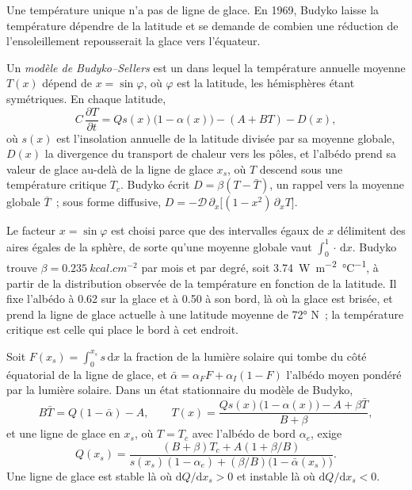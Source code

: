 Une température unique n'a pas de ligne de glace. En 1969, Budyko laisse la température
dépendre de la latitude et se demande de combien une réduction de l'ensoleillement
repousserait la glace vers l'équateur.

\begin{definition}\label{def:b3:climate-models:budyko-sellers}
Un \emph{modèle de Budyko--Sellers} est un
 dans lequel la température annuelle moyenne $T(x)$ dépend de
$x = \sin\varphi$, où $\varphi$ est la latitude, les hémisphères étant symétriques.
En chaque latitude,
\[
C\,\frac{\partial T}{\partial t} = Qs(x)\big(1 - \alpha(x)\big) - (A + BT) - D(x) ,
\]
où $s(x)$ est l'insolation annuelle de la latitude divisée par sa moyenne
globale, $D(x)$ la divergence du transport de chaleur vers les pôles, et l'albédo
prend sa valeur de glace au-delà de la ligne de glace $x_s$, où $T$ descend sous une
température critique $T_c$. Budyko écrit $D = \beta(T - \bar T)$, un
rappel vers la moyenne globale $\bar T$~; sous forme diffusive, $D =
-\mathcal D\,\partial_x\big[(1 - x^2)\,\partial_xT\big]$.
\end{definition}

Le facteur $x = \sin\varphi$ est choisi parce que des intervalles égaux de $x$
délimitent des aires égales de la sphère, de sorte qu'une moyenne globale vaut $\int_0^1\cdot\,\mathrm
dx$. Budyko trouve $\beta = \qty{0.235}{kcal.cm^{-2}}$ par mois et par
degré, soit \qty{3.74}{W.m^{-2}.\celsius^{-1}}, à partir de la distribution observée
de la température en fonction de la latitude. Il fixe l'albédo à 0.62 sur la glace et à 0.50 à son bord,
là où la glace est brisée, et prend la ligne de glace actuelle à une latitude moyenne
de \ang{72} N~; la température critique est celle qui place le bord
à cet endroit.

\begin{proposition}\label{prop:b3:climate-models:iceline}
Soit $F(x_s) = \int_0^{x_s}s\,\mathrm dx$ la fraction de la lumière solaire qui
tombe du côté équatorial de la ligne de glace, et $\bar\alpha = \alpha_FF + \alpha_I(1 -
F)$ l'albédo moyen pondéré par la lumière solaire. Dans un état stationnaire du
modèle de Budyko,
\[
B\bar T = Q(1 - \bar\alpha) - A, \qquad
T(x) = \frac{Qs(x)\big(1 - \alpha(x)\big) - A + \beta\bar T}{B + \beta} ,
\]
et une ligne de glace en $x_s$, où $T = T_c$ avec l'albédo de bord $\alpha_e$,
exige
\[
Q(x_s) = \frac{(B + \beta)T_c + A(1 + \beta/B)}{s(x_s)(1 - \alpha_e) +
(\beta/B)\big(1 - \bar\alpha(x_s)\big)} .
\]
Une ligne de glace est stable là où $\mathrm dQ/\mathrm dx_s > 0$ et instable
là où $\mathrm dQ/\mathrm dx_s < 0$.
\end{proposition}

